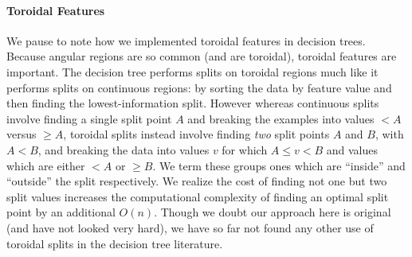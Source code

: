 \documentclass[11pt]{article}
\begin{document}
\paragraph{Toroidal Features} We pause to note how we implemented toroidal features in decision trees.  Because angular regions are so common (and are toroidal), toroidal features are important.  The decision tree performs splits on toroidal regions much like it performs splits on continuous regions: by sorting the data by feature value and then finding the lowest-information split.  However whereas continuous splits involve finding a single split point \(A\) and breaking the examples into values \(< A\) versus \(\geq A\), toroidal splits instead involve finding {\it two} split points \(A\) and \(B\), with \(A < B\), and breaking the data into values \(v\) for which \(A \leq v < B\) and values which are either \(< A\) or \(\geq B\).  We term these groups ones which are ``inside'' and ``outside'' the split respectively.  We realize the cost of finding not one but two split values increases the computational complexity of finding an optimal split point by an additional \(O(n)\).  Though we doubt our approach here is original (and have not looked very hard), we have so far not found any other use of toroidal splits in the decision tree literature.
\end{document}
